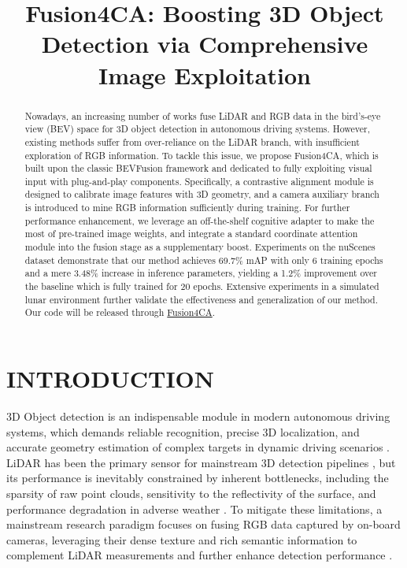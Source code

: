 \documentclass[letterpaper, 10 pt, conference]{ieeeconf}  %
\title{\LARGE \bf
Fusion4CA: Boosting 3D Object Detection via Comprehensive Image Exploitation
}
\begin{document}
\maketitle
\thispagestyle{empty}
\pagestyle{empty}


\begin{abstract}

Nowadays, an increasing number of works fuse LiDAR and RGB data in the bird's-eye view (BEV) space for 3D object detection in autonomous driving systems. However, existing methods suffer from over-reliance on the LiDAR branch, with insufficient exploration of RGB information. To tackle this issue, we propose Fusion4CA, which is built upon the classic BEVFusion framework and dedicated to fully exploiting visual input with plug-and-play components. Specifically, a contrastive alignment module is designed to calibrate image features with 3D geometry, and a camera auxiliary branch is introduced to mine RGB information sufficiently during training. For further performance enhancement, we leverage an off-the-shelf cognitive adapter to make the most of pre-trained image weights, and integrate a standard coordinate attention module into the fusion stage as a supplementary boost. Experiments on the nuScenes dataset demonstrate that our method achieves 69.7\% mAP with only 6 training epochs and a mere 3.48\% increase in inference parameters, yielding a 1.2\% improvement over the baseline which is fully trained for 20 epochs. Extensive experiments in a simulated lunar environment further validate the effectiveness and generalization of our method. Our code will be released through \href{https://github.com/Gorgeousful/Fusion4CA}{Fusion4CA}.

\end{abstract}


\section{INTRODUCTION}

3D Object detection is an indispensable module in modern autonomous driving systems, which demands reliable recognition, precise 3D localization, and accurate geometry estimation of complex targets in dynamic driving scenarios \cite{yurtsever2020survey,arnold2019survey}. LiDAR has been the primary sensor for mainstream 3D detection pipelines \cite{wu2022sparse,zhang2024safdnet,chen2023voxelnext}, but its performance is inevitably constrained by inherent bottlenecks, including the sparsity of raw point clouds, sensitivity to the reflectivity of the surface, and performance degradation in adverse weather \cite{wu2023virtual,li2020lidar}. To mitigate these limitations, a mainstream research paradigm focuses on fusing RGB data captured by on-board cameras, leveraging their dense texture and rich semantic information to complement LiDAR measurements and further enhance detection performance \cite{ibrahim2025multistream,bai2022transfusion,guan2022m3detr}.
\end{document}
